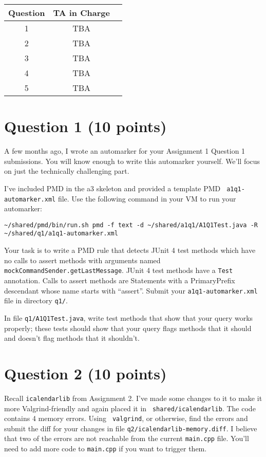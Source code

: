 \documentclass[10pt,hidelinks]{article}
\begin{document}
 \begin{center}
 \begin{tabular}{c|cc}
 Question   &  TA in Charge \\ \hline
1 & TBA \\
2 & TBA \\
3 & TBA \\
4 & TBA \\
5 & TBA
 \end{tabular}
 \end{center}

\newpage
\section*{Question 1 (10 points)}
A few months ago, I wrote an automarker for your Assignment 1 Question 1 submissions.
You will know enough to write this automarker yourself. We'll focus on just the
technically challenging part.

I've included PMD in the a3 skeleton and provided a template PMD {\tt
  a1q1-automarker.xml} file. Use the following command in your VM to run your automarker:

\begin{verbatim}
~/shared/pmd/bin/run.sh pmd -f text -d ~/shared/a1q1/A1Q1Test.java -R ~/shared/q1/a1q1-automarker.xml
\end{verbatim}

Your task is to write a PMD rule that detects JUnit 4 test methods which have no calls to assert methods with arguments named {\tt mockCommandSender.getLastMessage}. JUnit 4 test methods have a {\tt Test} annotation. Calls to assert methods are Statements with a PrimaryPrefix descendant whose name starts with ``assert''. Submit your {\tt a1q1-automarker.xml} file in directory {\tt q1/}.

In file {\tt q1/A1Q1Test.java}, write test methods that show
that your query works properly; these tests should show that your query flags methods
that it should and doesn't flag methods that it shouldn't.

\section*{Question 2 (10 points)}

Recall {\tt icalendarlib} from Assignment 2. I've made some changes to
it to make it more Valgrind-friendly and again placed it in {\tt
  shared/icalendarlib}. The code contains 4 memory errors. Using {\tt
  valgrind}, or otherwise, find the errors and submit the diff for
your changes in file {\tt q2/icalendarlib-memory.diff}. I believe that two of
the errors are not reachable from the current {\tt main.cpp}
file. You'll need to add more code to {\tt main.cpp} if you want to
trigger them.
\end{document}
